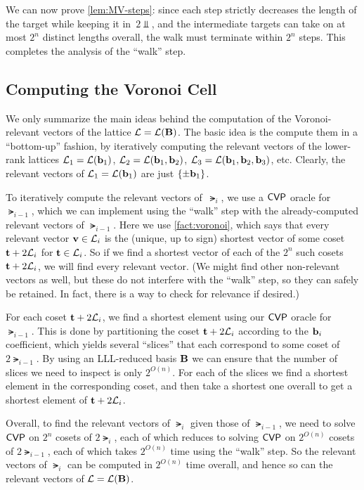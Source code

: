 \documentclass[11pt]{article}
\begin{document}
We can now prove \cref{lem:MV-steps}: since each step strictly
decreases the length of the target while keeping it in~$2\Vbar$, and
the intermediate targets can take on at most $2^{n}$ distinct lengths
overall, the walk must terminate within $2^{n}$ steps. This completes
the analysis of the ``walk'' step.

\subsection{Computing the Voronoi Cell}
\label{sec:comp-voron-cell}

We only summarize the main ideas behind the computation of the
Voronoi-relevant vectors of the lattice $\mathcal{L}=\mathcal{L}(\mathbf{B})$. The basic
idea is the compute them in a ``bottom-up'' fashion, by iteratively
computing the relevant vectors of the lower-rank lattices
$\mathcal{L}_{1} = \mathcal{L}(\mathbf{b}_{1})$, $\mathcal{L}_{2} = \mathcal{L}(\mathbf{b}_{1}, \mathbf{b}_{2})$,
$\mathcal{L}_{3}=\mathcal{L}(\mathbf{b}_{1}, \mathbf{b}_{2}, \mathbf{b}_{3})$, etc. Clearly, the
relevant vectors of $\mathcal{L}_{1} = \mathcal{L}(\mathbf{b}_{1})$ are just
$\{\pm \mathbf{b}_{1}\}$.

To iteratively compute the relevant vectors of~$\lat_{i}$, we use a
$\mathsf{CVP}$ oracle for~$\lat_{i-1}$, which we can implement using the
``walk'' step with the already-computed relevant vectors of
$\lat_{i-1}$. Here we use \cref{fact:voronoi}, which says that
every relevant vector $\mathbf{v} \in \mathcal{L}_{i}$ is the (unique, up to sign)
shortest vector of some coset $\mathbf{t} + 2\mathcal{L}_{i}$ for
$\mathbf{t} \in \mathcal{L}_{i}$. So if we find a shortest vector of each of the
$2^{n}$ such cosets $\mathbf{t} + 2\mathcal{L}_{i}$, we will find every relevant
vector. (We might find other non-relevant vectors as well, but these
do not interfere with the ``walk'' step, so they can safely be
retained. In fact, there is a way to check for relevance if desired.)

For each coset $\mathbf{t} + 2\mathcal{L}_{i}$, we find a shortest element using
our $\mathsf{CVP}$ oracle for $\lat_{i-1}$. This is done by partitioning the
coset $\mathbf{t} + 2\mathcal{L}_{i}$ according to the $\mathbf{b}_{i}$ coefficient,
which yields several ``slices'' that each correspond to some coset of
$2\lat_{i-1}$. By using an LLL-reduced basis $\mathbf{B}$ we can ensure
that the number of slices we need to inspect is only $2^{O(n)}$. For
each of the slices we find a shortest element in the corresponding
coset, and then take a shortest one overall to get a shortest element
of $\mathbf{t} + 2\mathcal{L}_{i}$.

Overall, to find the relevant vectors of $\lat_{i}$ given those of
$\lat_{i-1}$, we need to solve $\mathsf{CVP}$ on $2^{n}$ cosets of
$2\lat_{i}$, each of which reduces to solving $\mathsf{CVP}$ on $2^{O(n)}$
cosets of $2\lat_{i-1}$, each of which takes $2^{O(n)}$ time using the
``walk'' step. So the relevant vectors of $\lat_{i}$ can be computed
in $2^{O(n)}$ time overall, and hence so can the relevant vectors of
$\mathcal{L} = \mathcal{L}(\mathbf{B})$.



\end{document}
